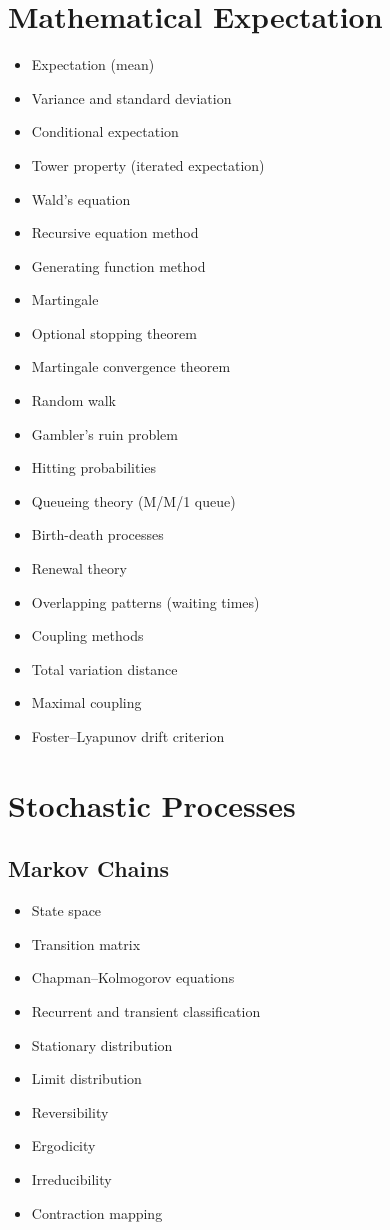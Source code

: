 \documentclass{amsart}
\begin{document}
\section{Mathematical Expectation}

\begin{itemize}
  \item Expectation (mean)
  \item Variance and standard deviation
  \item Conditional expectation
  \item Tower property (iterated expectation)
  \item Wald's equation
  \item Recursive equation method
  \item Generating function method
  \item Martingale
  \item Optional stopping theorem
  \item Martingale convergence theorem
  \item Random walk
  \item Gambler's ruin problem
  \item Hitting probabilities
  \item Queueing theory (M/M/1 queue)
  \item Birth-death processes
  \item Renewal theory
  \item Overlapping patterns (waiting times)
  \item Coupling methods
  \item Total variation distance
  \item Maximal coupling
  \item Foster--Lyapunov drift criterion
\end{itemize}

\section{Stochastic Processes}

\subsection{Markov Chains}
\begin{itemize}
  \item State space
  \item Transition matrix
  \item Chapman--Kolmogorov equations
  \item Recurrent and transient classification
  \item Stationary distribution
  \item Limit distribution
  \item Reversibility
  \item Ergodicity
  \item Irreducibility
  \item Contraction mapping
\end{itemize}
\end{document}
